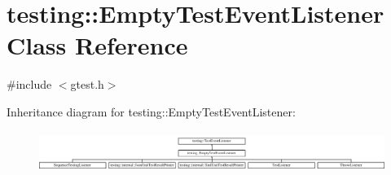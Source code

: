 \hypertarget{classtesting_1_1EmptyTestEventListener}{}\section{testing\+::Empty\+Test\+Event\+Listener Class Reference}
\label{classtesting_1_1EmptyTestEventListener}


{\ttfamily \#include $<$gtest.\+h$>$}

Inheritance diagram for testing\+::Empty\+Test\+Event\+Listener\+:\begin{figure}[H]
\begin{center}
\leavevmode
\includegraphics[height=1.328063cm]{classtesting_1_1EmptyTestEventListener}
\end{center}
\end{figure}
